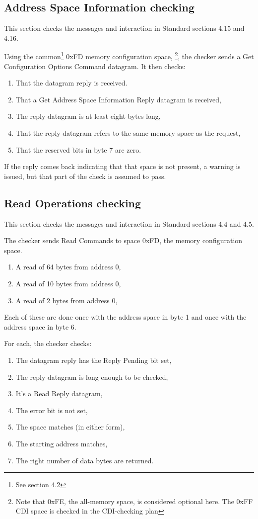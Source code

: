 \subsection{Address Space Information checking}

This section checks the messages and interaction in Standard sections 4.15 and 4.16.

Using the common\footnote{See section 4.2}
0xFD memory configuration space,
\footnote{Note that 0xFE, the all-memory space, is considered optional here. The 0xFF CDI 
space is checked in the CDI-checking plan}, 
the checker sends a Get Configuration Options Command datagram.  It then checks:
\begin{enumerate}
\item That the datagram reply is received.
\item That a Get Address Space Information Reply datagram is received,
\item The reply datagram is at least eight bytes long,
\item That the reply datagram refers to the same memory space as the request,
\item That the reserved bits in byte 7 are zero.
\end{enumerate}

If the reply comes back indicating that that space is not present, 
a warning is issued, but that part of the check is assumed to pass.

\subsection{Read Operations checking}

This section checks the messages and interaction in Standard sections 4.4 and 4.5.

The checker sends Read Commands to space 0xFD, the memory configuration space.

\begin{enumerate}
\item A read of 64 bytes from address 0,
\item A read of 10 bytes from address 0,
\item A read of 2 bytes from address 0,
\end{enumerate}

Each of these are done once with the address space in byte 1 
and once with the address space in byte 6.

For each, the checker checks:
\begin{enumerate}
\item The datagram reply has the Reply Pending bit set,
\item The reply datagram is long enough to be checked,
\item It's a Read Reply datagram,
\item The error bit is not set,
\item The space matches (in either form),
\item The starting address matches,
\item The right number of data bytes are returned.
\end{enumerate}

